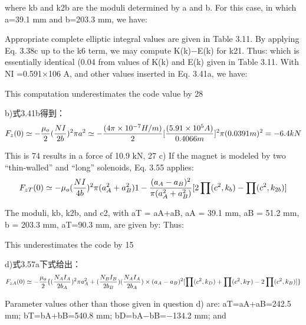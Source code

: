 where kb and k2b are the moduli determined by a and b. For this case, in which
a=39.1 mm and b=203.3 mm, we have:

Appropriate complete elliptic integral values are given in Table 3.11. By applying
Eq. 3.38c up to the k6 term, we may compute K(k)−E(k) for k21. Thus:
which is essentially identical (0.04%
from values of K(k) and E(k) given in Table 3.11.
With NI =0.591×106 A, and other values inserted in Eq. 3.41a, we have:

This computation underestimates the code value by 28%

b)式3.41b得到：
\begin{equation}
F_{z}(0)\simeq-\frac{\mu_{o}}{2}(\frac{NI}{2b})^{2}\pi a^{2}\\%
\simeq-\frac{(4\pi\times10^{-7}H/m)}{2}[\frac{(5.91\times10^{5}A)}{0.4066m}]^{2}\pi(0.0391m)^{2}\\
=-6.4kN\\
\end{equation}

This is 74%
results in a force of 10.9 kN, 27%
c) If the magnet is modeled by two “thin-walled” and “long” solenoids, Eq. 3.55
applies:
\begin{equation}
F_{zT}(0)\simeq-\mu_{o}(\frac{NI}{4b})^{2}\pi(a_{A}^{2}+a_{B}^{2}){1-\frac{(a_{A}-a_{B})^{2}}{\pi(a_{A}^{2}+a_{B}^{2})}[2\prod(c^{2},k_{b})-\prod(c^{2},k_{2b})]}\\%
\end{equation}

The moduli, kb, k2b, and c2, with aT = aA+aB, aA = 39.1 mm, aB = 51.2 mm, b =
203.3 mm, aT=90.3 mm, are given by:
Thus:

This underestimates the code by 15%


d)式3.57a下式给出：
\begin{equation}
F_{zA}(0)\simeq-\frac{\mu_{o}}{2}\{(\frac{N_{A}I_{A}}{2b_{A}})^{2}\pi a_{A}^{2}+(\frac{N_{B}I_{B}}{2b_{B}})(\frac{N_{A}I_{A}}{2b_{A}})\times\\
(a_{A}-a_{B})^{2}[\prod(c^{2},k_{D})+\prod(c^{2},k_{T})-2\prod(c^{2},k_{B})]\}\\%
\end{equation}

Parameter values other than those given in question d) are: aT=aA+aB=242.5 mm;
bT=bA+bB=540.8 mm; bD=bA−bB=−134.2 mm; and

